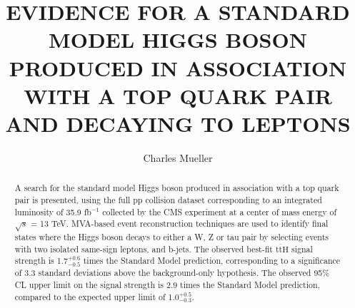\documentclass[final,numrefs,sort&compress,noinfo]{nddiss2e}
\newcommand{\tth}{\ensuremath{\mathrm{t}\overline{\mathrm{t}}\mathrm{H}}\xspace}
\begin{document}
\frontmatter         %

\title{EVIDENCE FOR A STANDARD MODEL HIGGS BOSON PRODUCED IN ASSOCIATION WITH A TOP QUARK PAIR AND DECAYING TO LEPTONS}
\author{Charles Mueller}           %

\maketitle           %

\makecopyright



\begin{abstract}
A search for the standard model Higgs boson produced in association with a top quark pair is presented, using the full pp collision
dataset corresponding to an integrated luminosity of 35.9 fb$^{-1}$ collected by the CMS experiment at a center of mass energy of $\sqrt{s}$ = 13 TeV.
MVA-based event reconstruction techniques are used to identify final states where the Higgs boson decays to either a W, Z or tau pair by
selecting events with two isolated same-sign leptons, and b-jets. The observed best-fit \tth signal strength is 1.7$^{+0.6}_{-0.5}$ times the
Standard Model prediction, corresponding to a significance of 3.3 standard deviations above the background-only hypothesis. The observed 95$\%$ CL
upper limit on the signal strength is 2.9 times the Standard Model prediction, compared to the expected upper limit of 1.0$^{+0.5}_{-0.3}$. 

\end{abstract}

\end{document}
